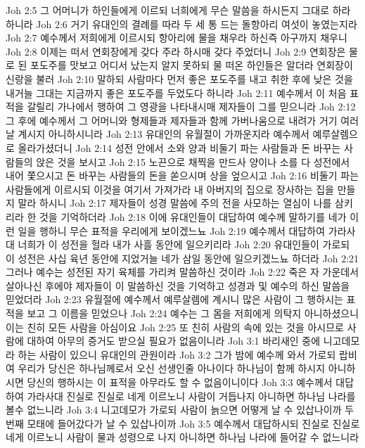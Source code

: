 Joh 2:5  그 어머니가 하인들에게 이르되 너희에게 무슨 말씀을 하시든지 그대로 하라 하니라
Joh 2:6  거기 유대인의 결례를 따라 두 세 통 드는 돌항아리 여섯이 놓였는지라
Joh 2:7  예수께서 저희에게 이르시되 항아리에 물을 채우라 하신즉 아구까지 채우니
Joh 2:8  이제는 떠서 연회장에게 갖다 주라 하시매 갖다 주었더니
Joh 2:9  연회장은 물로 된 포도주를 맛보고 어디서 났는지 알지 못하되 물 떠온 하인들은 알더라 연회장이 신랑을 불러
Joh 2:10  말하되 사람마다 먼저 좋은 포도주를 내고 취한 후에 낮은 것을 내거늘 그대는 지금까지 좋은 포도주를 두었도다 하니라
Joh 2:11  예수께서 이 처음 표적을 갈릴리 가나에서 행하여 그 영광을 나타내시매 제자들이 그를 믿으니라
Joh 2:12  그 후에 예수께서 그 어머니와 형제들과 제자들과 함께 가버나움으로 내려가 거기 여러 날 계시지 아니하시니라
Joh 2:13  유대인의 유월절이 가까운지라 예수께서 예루살렘으로 올라가셨더니
Joh 2:14  성전 안에서 소와 양과 비둘기 파는 사람들과 돈 바꾸는 사람들의 앉은 것을 보시고
Joh 2:15  노끈으로 채찍을 만드사 양이나 소를 다 성전에서 내어 쫓으시고 돈 바꾸는 사람들의 돈을 쏟으시며 상을 엎으시고
Joh 2:16  비둘기 파는 사람들에게 이르시되 이것을 여기서 가져가라 내 아버지의 집으로 장사하는 집을 만들지 말라 하시니
Joh 2:17  제자들이 성경 말씀에 주의 전을 사모하는 열심이 나를 삼키리라 한 것을 기억하더라
Joh 2:18  이에 유대인들이 대답하여 예수께 말하기를 네가 이런 일을 행하니 무슨 표적을 우리에게 보이겠느뇨
Joh 2:19  예수께서 대답하여 가라사대 너희가 이 성전을 헐라 내가 사흘 동안에 일으키리라
Joh 2:20  유대인들이 가로되 이 성전은 사십 육년 동안에 지었거늘 네가 삼일 동안에 일으키겠느뇨 하더라
Joh 2:21  그러나 예수는 성전된 자기 육체를 가리켜 말씀하신 것이라
Joh 2:22  죽은 자 가운데서 살아나신 후에야 제자들이 이 말씀하신 것을 기억하고 성경과 및 예수의 하신 말씀을 믿었더라
Joh 2:23  유월절에 예수께서 예루살렘에 계시니 많은 사람이 그 행하시는 표적을 보고 그 이름을 믿었으나
Joh 2:24  예수는 그 몸을 저희에게 의탁지 아니하셨으니 이는 친히 모든 사람을 아심이요
Joh 2:25  또 친히 사람의 속에 있는 것을 아시므로 사람에 대하여 아무의 증거도 받으실 필요가 없음이니라
Joh 3:1  바리새인 중에 니고데모라 하는 사람이 있으니 유대인의 관원이라
Joh 3:2  그가 밤에 예수께 와서 가로되 랍비여 우리가 당신은 하나님께로서 오신 선생인줄 아나이다 하나님이 함께 하시지 아니하시면 당신의 행하시는 이 표적을 아무라도 할 수 없음이니이다
Joh 3:3  예수께서 대답하여 가라사대 진실로 진실로 네게 이르노니 사람이 거듭나지 아니하면 하나님 나라를 볼수 없느니라
Joh 3:4  니고데모가 가로되 사람이 늙으면 어떻게 날 수 있삽나이까 두번째 모태에 들어갔다가 날 수 있삽나이까
Joh 3:5  예수께서 대답하시되 진실로 진실로 네게 이르노니 사람이 물과 성령으로 나지 아니하면 하나님 나라에 들어갈 수 없느니라
